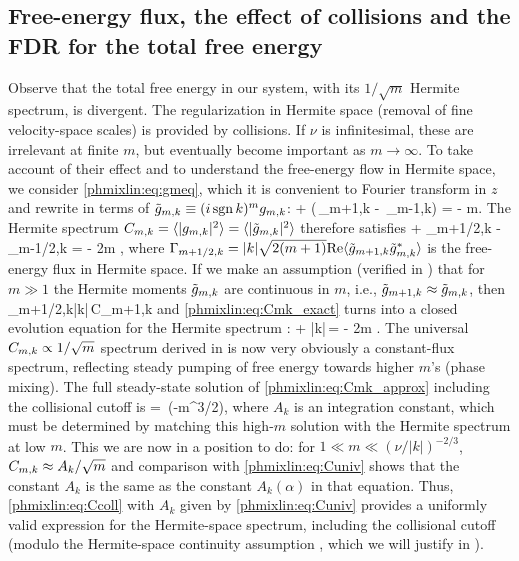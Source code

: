 \subsection{Free-energy flux, the effect of collisions and the FDR for the total free energy}
\label{phmixlin:sec:flux}

Observe that the total free energy in our system, with its $1/\sqrt{m}$ 
Hermite spectrum, is divergent. The regularization in Hermite space 
(removal of fine velocity-space scales) is provided by collisions. 
If $\nu$ is infinitesimal, these are irrelevant at finite $m$, 
but eventually become important as $m\to\infty$. To take account 
of their effect and to understand the free-energy flow in 
Hermite space, we consider \eqref{phmixlin:eq:gmeq}, which it is convenient 
to Fourier transform in $z$ and rewrite in terms of 
$\tilde g_{m,k} \equiv (i\,{\rm sgn}\, k)^mg_{m,k}$: 
\beq
{} + \lt(\,\tg_{m+1,k} - \,\tg_{m-1,k}\rt) 
= - \nu m\tgmk. 
\label{phmixlin:eq:tg}
\eeq
The Hermite spectrum $C_{m,k}=\langle|g_{m,k}|^2\rangle =\langle|\tilde g_{m,k}|^2\rangle$ therefore satisfies 
\beq
{} + \Gamma_{m+1/2,k} - \Gamma_{m-1/2,k} = - 2\nu m \Cmk,
\label{phmixlin:eq:Cmk_exact}
\eeq
where $\Gamma_{m+1/2,k} = |k|\sqrt{2(m+1)}{\rm Re}\langle\tilde g_{m+1,k}\tilde g_{m,k}^*\rangle$ is the 
free-energy flux in Hermite space. If we make an assumption 
(verified in )
that for $m\gg1$ the Hermite moments $\tilde g_{m,k}$ are continuous in $m$, i.e., 
$\tilde g_{m+1,k}\approx\tilde g_{m,k}$, then 
\beq
\Gamma_{m+1/2,k}\approx |k|\,C_{m+1,k}
\label{phmixlin:eq:Gamma_cont}
\eeq
and \eqref{phmixlin:eq:Cmk_exact} turns into a closed evolution equation for the 
Hermite spectrum \cite{zocco11}: 
\beq
{} + |k|\,\Cmk = - 2\nu m \Cmk.
\label{phmixlin:eq:Cmk_approx}
\eeq
The universal $C_{m,k}\propto 1/\sqrt{m}$ spectrum derived in  
is now very obviously a constant-flux spectrum, reflecting steady 
pumping of free energy towards higher $m$'s (phase mixing). 
The full steady-state solution of 
\eqref{phmixlin:eq:Cmk_approx} including the collisional cutoff is 
\beq
\Cmk = \,\exp\lt(-m^{3/2}\rt),
\label{phmixlin:eq:Ccoll}
\eeq
where $A_k$ is an integration constant, which must be determined by matching 
this high-$m$ solution with the Hermite spectrum at low $m$. This we are now 
in a position to do: for $1\ll m\ll (\nu/|k|)^{-2/3}$, $C_{m,k}\approx A_k/\sqrt{m}$ 
and comparison with \eqref{phmixlin:eq:Cuniv} shows that the constant $A_k$ is the 
same as the constant $A_k(\alpha)$ in that equation. Thus, \eqref{phmixlin:eq:Ccoll} 
with $A_k$ given by \eqref{phmixlin:eq:Cuniv} provides a uniformly valid 
expression for the Hermite-space spectrum, including the collisional cutoff
(modulo the Hermite-space continuity assumption , 
which we will justify in ).  

